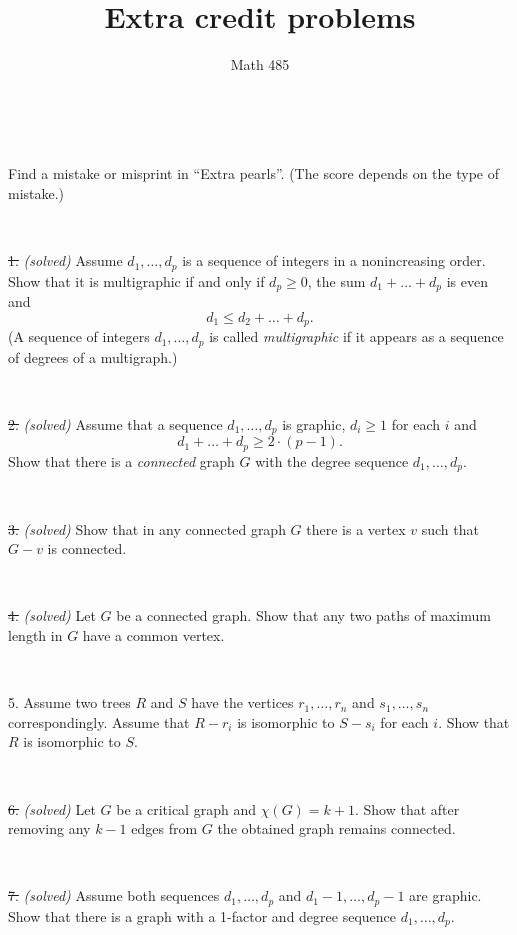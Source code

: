 \documentclass[oneside,a4paper]{article}
\begin{document}
%
\title{Extra credit problems}
\author{Math 485}
\date{}
\maketitle

\textit{}


\ 

 Find a mistake or misprint in ``Extra pearls''.
(The score depends on the type of mistake.)


\ 

\noindent \sout{1.} \textit{(solved)}
Assume $d_1,\dots, d_p$ is a sequence of integers in a nonincreasing order.
Show that it is multigraphic if and only if $d_p\ge0$, the sum $d_1+\dots+ d_p$ is even and 
\[d_1\le d_2+\dots+d_p.\]
(A sequence of integers $d_1,\dots, d_p$ is called \textit{multigraphic} if it appears as a sequence of degrees of a multigraph.)

\ 

\noindent \sout{2.} \textit{(solved)}
Assume that a sequence $d_1,\dots, d_p$ is graphic,
$d_i\ge 1$ for each $i$ and 
\[d_1+\dots+d_p\ge 2\cdot(p-1).\]
Show that there is a \textit{connected} graph $G$ with the degree sequence $d_1,\dots, d_p$.


\ 

\noindent 
\sout{3.} \textit{(solved)}
Show that in any connected graph $G$ there is a vertex $v$ such that $G-v$ is connected.

\ 


\noindent
\sout{4.} \textit{(solved)}
Let $G$ be a  connected graph.
Show that any two paths of maximum length in $G$ have a common vertex.


\ 

\noindent %
{5.} %
Assume two trees $R$ and $S$ 
have the vertices $r_1,\dots,r_n$ and $s_1,\dots,s_n$ correspondingly.
Assume that $R-r_i$ is isomorphic to $S-s_i$ for each $i$.
Show that $R$ is isomorphic to $S$.

\ 

\noindent 
\sout{6.} \textit{(solved)}
Let $G$ be a critical graph and $\chi(G)=k+1$.
Show that after removing any $k-1$ edges from $G$  
the obtained graph remains connected. 

\ 

\noindent %
\sout{7.} \textit{(solved)}
Assume both sequences $d_1,\dots, d_p$
 and $d_1-1,\dots, d_p-1$ are graphic.
Show that there is a graph with a 1-factor and degree sequence $d_1,\dots, d_p$.
\end{document}
